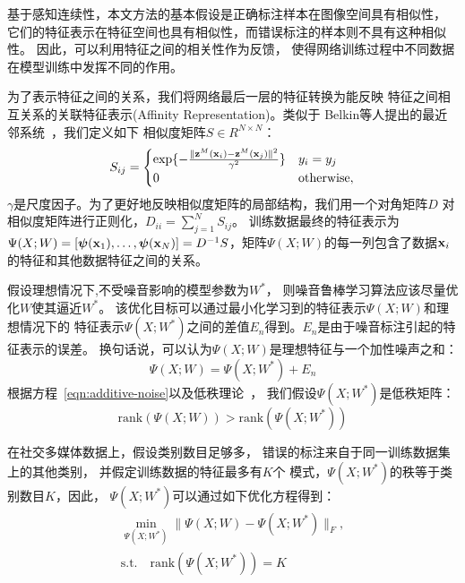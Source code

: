 基于感知连续性，本文方法的基本假设是正确标注样本在图像空间具有相似性，
它们的特征表示在特征空间也具有相似性，而错误标注的样本则不具有这种相似性。
因此，可以利用特征之间的相关性作为反馈，
使得网络训练过程中不同数据在模型训练中发挥不同的作用。

为了表示特征之间的关系，我们将网络最后一层的特征转换为能反映
特征之间相互关系的关联特征表示(Affinity Representation)。类似于
Belkin等人提出的最近邻系统~\cite{belkin2001laplacian}，我们定义如下
相似度矩阵$S\in R^{N \times N}$：
\begin{equation}\label{eqn:rf-cnn-sim}
    S_{ij} =
    \begin{cases}
        \exp\{-\frac{\|\mathbf{z}^M(\mathbf{x}_i) - \mathbf{z}^M(\mathbf{x}_j)\|^2}{\gamma^2}\} & y_i = y_j\\
        0 & \text{otherwise},
    \end{cases}
\end{equation}
$\gamma$是尺度因子。为了更好地反映相似度矩阵的局部结构，我们用一个对角矩阵$D$
对相似度矩阵进行正则化，$D_{ii} = \sum_{j=1}^N S_{ij}$。
训练数据最终的特征表示为$\Psi(X;W) = [\boldsymbol{\psi}(\mathbf{x}_1), \ldots, \boldsymbol{\psi}(\mathbf{x}_N)] =
D^{-1}S$，矩阵$\Psi(X;W)$的每一列包含了数据$\mathbf{x}_i$的特征和其他数据特征之间的关系。

假设理想情况下,不受噪音影响的模型参数为$W^*$，
则噪音鲁棒学习算法应该尽量优化$W$使其逼近$W^*$。
该优化目标可以通过最小化学习到的特征表示$\Psi(X;W)$和理想情况下的
特征表示$\Psi(X;W^*)$之间的差值$E_n$得到。$E_n$是由于噪音标注引起的特征表示的误差。
换句话说，可以认为$\Psi(X;W)$是理想特征与一个加性噪声之和：
\begin{equation}
    \Psi(X;W) = \Psi(X;W^*) + E_n
    \label{eqn:additive-noise}
\end{equation}
根据方程~\eqref{eqn:additive-noise}以及低秩理论~\cite{candes2011robust}，
我们假设$\Psi(X;W^*)$是低秩矩阵：
\begin{equation}
    \text{rank}(\Psi(X;W)) > \text{rank}(\Psi(X;W^*))
\end{equation}

在社交多媒体数据上，假设类别数目足够多，
错误的标注来自于同一训练数据集上的其他类别， 并假定训练数据的特征最多有$K$个
模式，$\Psi(X;W^*)$的秩等于类别数目$K$，因此， $\Psi(X;
W^*)$可以通过如下优化方程得到：
\begin{eqnarray}
    \label{eqn:low-rank}
    \min_{\Psi(X;W^*)} \|\Psi(X;W) - \Psi(X;W^*)\|_F, \\ \nonumber
    \text{s.t.} \quad  \text{rank}(\Psi(X;W^*)) = K
\end{eqnarray}

